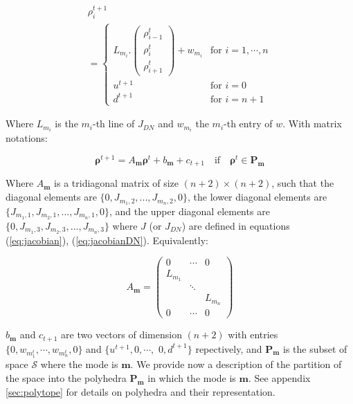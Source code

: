 \begin{equation}
\begin{array}{l}
\rho^{t+1}_{i}\\
= \begin{cases}
L_{m_{i}}.\left( \begin{array}{c}
\rho^{t}_{i-1}\\
\rho^{t}_{i}\\
\rho^{t}_{i+1}
\end{array} \right)
+ w_{m_{i}} & \text{for }i=1,\cdots,n\\
u^{t+1} & \text{for }i=0\\
d^{t+1} & \text{for }i=n+1
\end{cases}
\end{array}
\label{eq:underlyingSystemDN}
\end{equation}

\noindent Where $L_{m_{i}}$ is the $m_{i}$-th line of $J_{DN}$ and $w_{m_{i}}$ the $m_{i}$-th entry of $w$. With matrix notations:

\begin{equation}
\boldsymbol\rho^{t+1} = A_{\boldsymbol m} \boldsymbol\rho^{t} + b_{\boldsymbol m} + c_{t+1} \quad\text{if}\quad\boldsymbol\rho^{t}\in\textbf{P}_{\boldsymbol m}
\label{eq:underlyingSystemDN2}
\end{equation}

\noindent Where $A_{\boldsymbol m}$ is a tridiagonal matrix of size $(n+2)\times(n+2)$, such that the diagonal elements are $\{0, J_{m_{1},2},...,J_{m_{n},2},0\}$, the lower diagonal elements are $\{J_{m_{1},1},J_{m_{2},1},...,J_{m_{n},1},0\}$, and the upper diagonal elements are $\{0,J_{m_{1},3},J_{m_{2},3},...,J_{m_{n},3}\}$ where $J$ (or $J_{DN}$) are defined in equations (\ref{eq:jacobian}), (\ref{eq:jacobianDN}). Equivalently:

\begin{equation}\label{eq:matrixA}
 A_{\boldsymbol m} =
 \begin{pmatrix}
0 & \cdots & 0 \\
L_{m_{1}} & & \\
& \ddots & \\
& & L_{m_{n}}\\
0 & \cdots & 0
\end{pmatrix}
\end{equation}

\noindent $b_{\boldsymbol m}$ and $c_{t+1}$ are two vectors of dimension $(n+2)$ with entries $\{0,w_{m^{t}_{1}},\cdots,w_{m^{t}_{n}},0\}$ and $\{u^{t+1},0,\cdots,$ $0,d^{t+1}\}$ repectively, and $\textbf{P}_{\boldsymbol m}$ is the subset of space $\mathcal{S}$ where the mode is $\boldsymbol m$. We provide now a description of the partition of the space into the polyhedra $\textbf{P}_{\boldsymbol m}$ in which the mode is $\boldsymbol m$. See appendix \ref{sec:polytope} for details on polyhedra and their representation.

